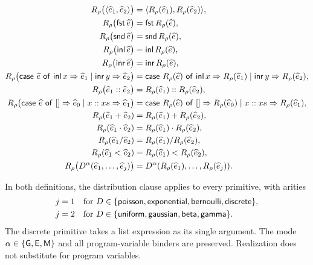 \begin{definition}
\[
\begin{aligned}
  R_\rho\bigl(\langle \widehat e_1,\widehat e_2\rangle\bigr)&=\langle R_\rho(\widehat e_1),R_\rho(\widehat e_2)\rangle,\\
  R_\rho\bigl(\mathsf{fst}\,\widehat e\bigr)&=\mathsf{fst}\,R_\rho(\widehat e),\\
  R_\rho\bigl(\mathsf{snd}\,\widehat e\bigr)&=\mathsf{snd}\,R_\rho(\widehat e),\\
  R_\rho\bigl(\mathsf{inl}\,\widehat e\bigr)&=\mathsf{inl}\,R_\rho(\widehat e),\\
  R_\rho\bigl(\mathsf{inr}\,\widehat e\bigr)&=\mathsf{inr}\,R_\rho(\widehat e),\\
  R_\rho\bigl(\mathsf{case}\ \widehat e\ \mathsf{of}\ \mathsf{inl}\,x\Rightarrow \widehat e_1\mid\mathsf{inr}\,y\Rightarrow \widehat e_2\bigr)&=\mathsf{case}\ R_\rho(\widehat e)\ \mathsf{of}\ \mathsf{inl}\,x\Rightarrow R_\rho(\widehat e_1)\mid\mathsf{inr}\,y\Rightarrow R_\rho(\widehat e_2),\\
  R_\rho\bigl(\widehat e_1::\widehat e_2\bigr)&=R_\rho(\widehat e_1)::R_\rho(\widehat e_2),\\
  R_\rho\bigl(\mathsf{case}\ \widehat e\ \mathsf{of}\ []\Rightarrow \widehat e_0\mid x::xs\Rightarrow \widehat e_1\bigr)&=\mathsf{case}\ R_\rho(\widehat e)\ \mathsf{of}\ []\Rightarrow R_\rho(\widehat e_0)\mid x::xs\Rightarrow R_\rho(\widehat e_1),\\
  R_\rho(\widehat e_1+\widehat e_2)&=R_\rho(\widehat e_1)+R_\rho(\widehat e_2),\\
  R_\rho(\widehat e_1\cdot\widehat e_2)&=R_\rho(\widehat e_1)\cdot R_\rho(\widehat e_2),\\
  R_\rho(\widehat e_1/\widehat e_2)&=R_\rho(\widehat e_1)/R_\rho(\widehat e_2),\\
  R_\rho(\widehat e_1<\widehat e_2)&=R_\rho(\widehat e_1)<R_\rho(\widehat e_2),\\
  R_\rho\bigl(D^\alpha(\widehat e_1,\ldots,\widehat e_j)\bigr)
    &=D^\alpha(R_\rho(\widehat e_1),\ldots,R_\rho(\widehat e_j)).
\end{aligned}
\]
\end{definition}

In both definitions, the distribution clause applies to every primitive,
with arities
\[
\begin{aligned}
 j&=1 &&\text{for }D\in\{\mathsf{poisson},\mathsf{exponential},\mathsf{bernoulli},\mathsf{discrete}\},\\
 j&=2 &&\text{for }D\in\{\mathsf{uniform},\mathsf{gaussian},\mathsf{beta},\mathsf{gamma}\}.
\end{aligned}
\]
The discrete primitive takes a list expression as its single argument.
The mode $\alpha\in\{\mathsf{G},\mathsf{E},\mathsf{M}\}$ and all program-variable binders are
preserved. Realization does not substitute for program variables.


